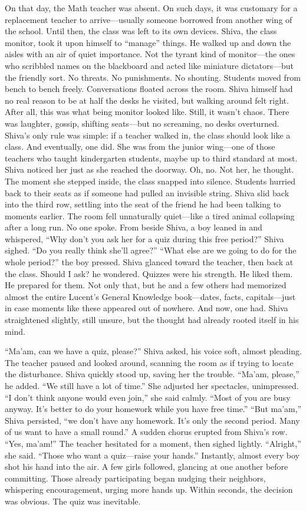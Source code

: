 On that day, the Math teacher was absent.  On such days, it was customary for a replacement teacher to arrive—usually someone borrowed from another wing of the school. Until then, the class was left to its own devices. Shiva, the class monitor, took it upon himself to ``manage'' things. He walked up and down the aisles with an air of quiet importance. Not the tyrant kind of monitor—the ones who scribbled names on the blackboard and acted like miniature dictators—but the friendly sort. No threats. No punishments. No shouting. Students moved from bench to bench freely. Conversations floated across the room. Shiva himself had no real reason to be at half the desks he visited, but walking around felt right. After all, this was what being monitor looked like. Still, it wasn't chaos. There was laughter, gossip, shifting seats—but no screaming, no desks overturned. Shiva's only rule was simple: if a teacher walked in, the class should look like a class. And eventually, one did. She was from the junior wing—one of those teachers who taught kindergarten students, maybe up to third standard at most. Shiva noticed her just as she reached the doorway. Oh, no. Not her, he thought. The moment she stepped inside, the class snapped into silence. Students hurried back to their seats as if someone had pulled an invisible string. Shiva slid back into the third row, settling into the seat of the friend he had been talking to moments earlier. The room fell unnaturally quiet—like a tired animal collapsing after a long run. No one spoke. From beside Shiva, a boy leaned in and whispered, ``Why don't you ask her for a quiz during this free period?'' Shiva sighed. ``Do you really think she'll agree?'' ``What else are we going to do for the whole period?'' the boy pressed. Shiva glanced toward the teacher, then back at the class. Should I ask? he wondered. Quizzes were his strength. He liked them. He prepared for them. Not only that, but he and a few others had memorized almost the entire Lucent's General Knowledge book—dates, facts, capitals—just in case moments like these appeared out of nowhere. And now, one had. Shiva straightened slightly, still unsure, but the thought had already rooted itself in his mind.

``Ma'am, can we have a quiz, please?'' Shiva asked, his voice soft, almost pleading. The teacher paused and looked around, scanning the room as if trying to locate the disturbance. Shiva quickly stood up, saving her the trouble. ``Ma'am, please,'' he added. ``We still have a lot of time.'' She adjusted her spectacles, unimpressed. ``I don't think anyone would even join,'' she said calmly. ``Most of you are busy anyway. It's better to do your homework while you have free time.'' ``But ma'am,'' Shiva persisted, ``we don't have any homework. It's only the second period. Many of us want to have a small round.'' A sudden chorus erupted from Shiva's row. ``Yes, ma'am!'' The teacher hesitated for a moment, then sighed lightly. ``Alright,'' she said. ``Those who want a quiz—raise your hands.'' Instantly, almost every boy shot his hand into the air. A few girls followed, glancing at one another before committing. Those already participating began nudging their neighbors, whispering encouragement, urging more hands up. Within seconds, the decision was obvious. The quiz was inevitable.

